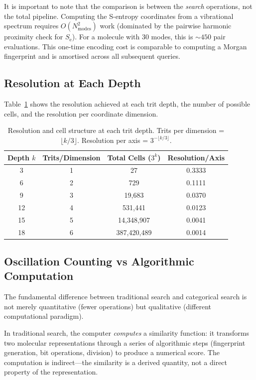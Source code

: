 \documentclass[11pt,twocolumn,a4paper]{article}
\theoremstyle{definition}
\theoremstyle{remark}
\newcommand{\Se}{S_{\mathrm{e}}}
\begin{document}
It is important to note that the comparison is between the \emph{search} operations, not the total pipeline. Computing the S-entropy coordinates from a vibrational spectrum requires $O(N_{\mathrm{modes}}^2)$ work (dominated by the pairwise harmonic proximity check for $\Se$). For a molecule with 30 modes, this is $\sim 450$ pair evaluations. This one-time encoding cost is comparable to computing a Morgan fingerprint and is amortised across all subsequent queries.

\subsection{Resolution at Each Depth}

Table~\ref{tab:resolution} shows the resolution achieved at each trit depth, the number of possible cells, and the resolution per coordinate dimension.

\begin{table}[H]
\centering
\caption{Resolution and cell structure at each trit depth. Trits per dimension = $\lfloor k/3 \rfloor$. Resolution per axis = $3^{-\lfloor k/3 \rfloor}$.}
\label{tab:resolution}
\begin{tabular}{cccc}
\toprule
Depth $k$ & Trits/Dimension & Total Cells ($3^k$) & Resolution/Axis \\
\midrule
3  & 1 & 27 & 0.3333 \\
6  & 2 & 729 & 0.1111 \\
9  & 3 & 19{,}683 & 0.0370 \\
12 & 4 & 531{,}441 & 0.0123 \\
15 & 5 & 14{,}348{,}907 & 0.0041 \\
18 & 6 & 387{,}420{,}489 & 0.0014 \\
\bottomrule
\end{tabular}
\end{table}

\subsection{Oscillation Counting vs Algorithmic Computation}

The fundamental difference between traditional search and categorical search is not merely quantitative (fewer operations) but qualitative (different computational paradigm).

In traditional search, the computer \emph{computes} a similarity function: it transforms two molecular representations through a series of algorithmic steps (fingerprint generation, bit operations, division) to produce a numerical score. The computation is indirect---the similarity is a derived quantity, not a direct property of the representation.
\end{document}
